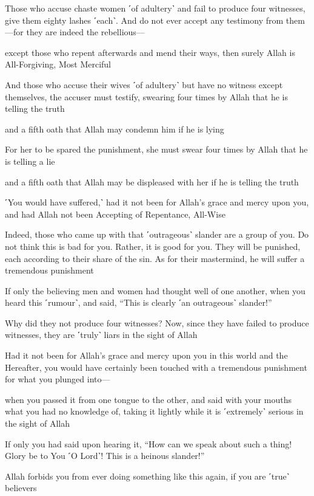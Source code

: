 Those who accuse chaste women ˹of adultery˺ and fail to produce four witnesses, give them eighty lashes ˹each˺. And do not ever accept any testimony from them—for they are indeed the rebellious—

except those who repent afterwards and mend their ways, then surely Allah is All-Forgiving, Most Merciful

And those who accuse their wives ˹of adultery˺ but have no witness except themselves, the accuser must testify, swearing four times by Allah that he is telling the truth

and a fifth oath that Allah may condemn him if he is lying

For her to be spared the punishment, she must swear four times by Allah that he is telling a lie

and a fifth oath that Allah may be displeased with her if he is telling the truth

˹You would have suffered,˺ had it not been for Allah’s grace and mercy upon you, and had Allah not been Accepting of Repentance, All-Wise

Indeed, those who came up with that ˹outrageous˺ slander are a group of you. Do not think this is bad for you. Rather, it is good for you. They will be punished, each according to their share of the sin. As for their mastermind, he will suffer a tremendous punishment

If only the believing men and women had thought well of one another, when you heard this ˹rumour˺, and said, “This is clearly ˹an outrageous˺ slander!”

Why did they not produce four witnesses? Now, since they have failed to produce witnesses, they are ˹truly˺ liars in the sight of Allah

Had it not been for Allah’s grace and mercy upon you in this world and the Hereafter, you would have certainly been touched with a tremendous punishment for what you plunged into—

when you passed it from one tongue to the other, and said with your mouths what you had no knowledge of, taking it lightly while it is ˹extremely˺ serious in the sight of Allah

If only you had said upon hearing it, “How can we speak about such a thing! Glory be to You ˹O Lord˺! This is a heinous slander!”

Allah forbids you from ever doing something like this again, if you are ˹true˺ believers

